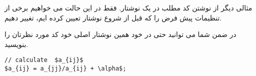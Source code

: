 مثالی دیگر از نوشتن کد مطلب در یک نوشتار. فقط در این حالت می خواهیم برخی از تنظیمات پیش فرض را که قبل از شروع نوشتار تعیین کرده ایم، تغییر دهیم. 
\begin{latin}

\end{latin}

در ضمن شما می توانید حتی در خود همین نوشتار اصلی خود کد مورد نظرتان را بنویسید. 
\begin{latin}
\begin{lstlisting}[mathescape=true]
// calculate  $a_{ij}$
$a_{ij} = a_{jj}/a_{ij} + \alpha$;
\end{lstlisting}
\end{latin}